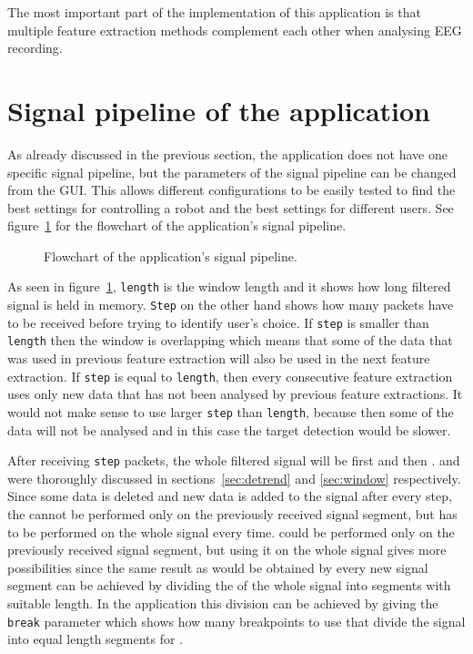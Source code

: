 The most important part of the implementation of this application is that multiple \gls{feature extraction} methods complement each other when analysing \gls{EEG} recording.

\section{Signal pipeline of the application}
\label{sec:signal_pipeline}

As already discussed in the previous section, the application does not have one specific signal pipeline, but the parameters of the signal pipeline can be changed from the \gls{GUI}. This allows different configurations to be easily tested to find the best settings for controlling a robot and the best settings for different users. See figure~\ref{fig:signal_pipeline} for the flowchart of the application's signal pipeline.

\begin{figure}[h!]
	
	\caption{Flowchart of the application's signal pipeline.}
	\label{fig:signal_pipeline}
\end{figure}

As seen in figure~\ref{fig:signal_pipeline}, \texttt{length} is the \gls{window} length and it shows how long filtered signal is held in memory. \texttt{Step} on the other hand shows how many packets have to be received before trying to identify user's choice. If \texttt{step} is smaller than \texttt{length} then the \gls{window} is overlapping which means that some of the data that was used in previous \gls{feature extraction} will also be used in the next \gls{feature extraction}. If \texttt{step} is equal to \texttt{length}, then every consecutive \gls{feature extraction} uses only new data that has not been analysed by previous \glspl{feature extraction}. It would not make sense to use larger \texttt{step} than \texttt{length}, because then some of the data will not be analysed and in this case the \gls{target} detection would be slower.

After receiving \texttt{step} packets, the whole filtered signal will be first  and then .  and  were thoroughly discussed in sections~\ref{sec:detrend} and \ref{sec:window} respectively. Since some data is deleted and new data is added to the signal after every step, the  cannot be performed only on the previously received signal segment, but has to be performed on the whole signal every time.  could be performed only on the previously received signal segment, but using it on the whole signal gives more possibilities since the same result as would be obtained by  every new signal segment can be achieved by dividing the  of the whole signal into segments with suitable length. In the application this division can be achieved by giving the \texttt{break} parameter which shows how many breakpoints to use that divide the signal into equal length segments for .

